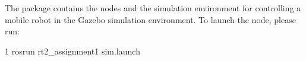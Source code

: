 The package contains the nodes and the simulation environment for controlling a mobile robot in the Gazebo simulation environment. To launch the node, please run\+: 
\begin{DoxyCode}
1 rosrun rt2\_assignment1 sim.launch
\end{DoxyCode}
 